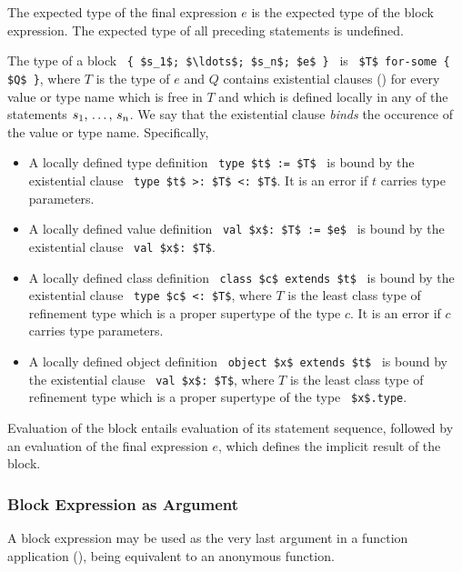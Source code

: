 The expected type of the final expression $e$ is the expected type of the block expression. The expected type of all preceding statements is undefined. 

The type of a block ~\lstinline!{ $s_1$; $\ldots$; $s_n$; $e$ }!~ is ~\lstinline!$T$ for-some { $Q$ }!, where $T$ is the type of $e$ and $Q$ contains existential clauses () for every value or type name which is free in $T$ and which is defined locally in any of the statements $s_1 ,\, \ldots ,\, s_n$. We say that the existential clause {\em binds} the occurence of the value or type name. Specifically, 
\begin{itemize}

\item A locally defined type definition ~\lstinline!type $t$ := $T$!~ is bound by the existential clause ~\lstinline!type $t$ >: $T$ <: $T$!. It is an error if $t$ carries type parameters. 

\item A locally defined value definition ~\lstinline!val $x$: $T$ := $e$!~ is bound by the existential clause ~\lstinline!val $x$: $T$!. 

\item A locally defined class definition ~\lstinline!class $c$ extends $t$!~ is bound by the existential clause ~\lstinline!type $c$ <: $T$!, where $T$ is the least class type of refinement type which is a proper supertype of the type $c$. It is an error if $c$ carries type parameters. 

\item A locally defined object definition ~\lstinline!object $x$ extends $t$!~ is bound by the existential clause ~\lstinline!val $x$: $T$!, where $T$ is the least class type of refinement type which is a proper supertype of the type ~\lstinline!$x$.type!.
\end{itemize}

Evaluation of the block entails evaluation of its statement sequence, followed by an evaluation of the final expression $e$, which defines the implicit result of the block. 





\subsubsection{Block Expression as Argument}
\label{sec:block-arguments}

A block expression may be used as the very last argument in a function application (), being equivalent to an anonymous function. 

